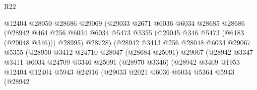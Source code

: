 \begin{lexlean}{R22}
\begin{coremodule}
                                    @12404
                                    @28050
                                    @28686
                                    @29069
                                    (@29033
                                      @2671
                                      @6036
                                      @6034
                                      @28685
                                      @28686
                                      (@28942
                                        @464
                                        @256
                                        @6034
                                        @6034
                                        @5473
                                        @5355
                                        (@29045 @346 @5473 (@6183 (@29048 @346)))
                                        @28995)
                                      @28728)
                                    (@28942
                                      @3413
                                      @256
                                      @28048
                                      @6034
                                      @29067
                                      @5355
                                      (@28950
                                        @3412
                                        @24710
                                        @28047
                                        (@28684 @25091)
                                        @29067
                                        (@28942
                                          @3347
                                          @3411
                                          @6034
                                          @24709
                                          @3346
                                          @25091
                                          (@28970 @3346)
                                          (@28942
                                            @3409
                                            @1953
                                            @12404
                                            @12404
                                            @5943
                                            @24916
                                            (@29033
                                              @2021
                                              @6036
                                              @6034
                                              @5364
                                              @5943
                                              (@28942

\end{coremodule}
\end{lexlean}
